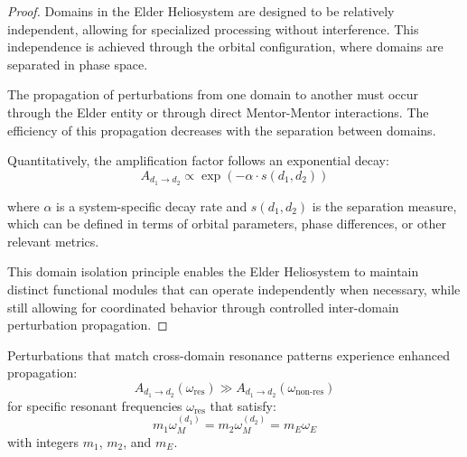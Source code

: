 \begin{proof}
Domains in the Elder Heliosystem are designed to be relatively independent, allowing for specialized processing without interference. This independence is achieved through the orbital configuration, where domains are separated in phase space.

The propagation of perturbations from one domain to another must occur through the Elder entity or through direct Mentor-Mentor interactions. The efficiency of this propagation decreases with the separation between domains.

Quantitatively, the amplification factor follows an exponential decay:
\begin{equation}
A_{d_1 \to d_2} \propto \exp(-\alpha \cdot s(d_1, d_2))
\end{equation}

where $\alpha$ is a system-specific decay rate and $s(d_1, d_2)$ is the separation measure, which can be defined in terms of orbital parameters, phase differences, or other relevant metrics.

This domain isolation principle enables the Elder Heliosystem to maintain distinct functional modules that can operate independently when necessary, while still allowing for coordinated behavior through controlled inter-domain perturbation propagation.
\end{proof}

\begin{theorem}
Perturbations that match cross-domain resonance patterns experience enhanced propagation:
\begin{equation}
A_{d_1 \to d_2}(\omega_{\text{res}}) \gg A_{d_1 \to d_2}(\omega_{\text{non-res}})
\end{equation}
for specific resonant frequencies $\omega_{\text{res}}$ that satisfy:
\begin{equation}
m_1 \omega_{M}^{(d_1)} = m_2 \omega_{M}^{(d_2)} = m_E \omega_E
\end{equation}
with integers $m_1$, $m_2$, and $m_E$.
\end{theorem}


